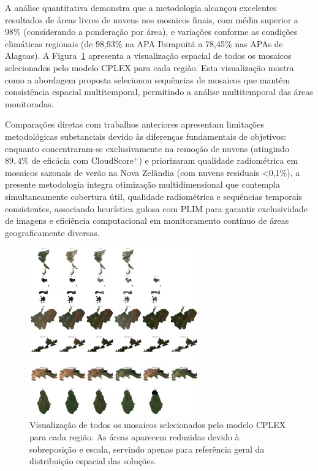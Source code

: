 \documentclass[a4paper,11pt]{article}
\begin{document}
A análise quantitativa demonstra que a metodologia alcançou excelentes resultados de áreas livres de nuvens nos mosaicos finais, com média superior a 98\% (considerando a ponderação por área), e variações conforme as condições climáticas regionais (de 98,93\% na APA Ibirapuitã a 78,45\% nas APAs de Alagoas). A Figura~\ref{fig:all_outputs} apresenta a visualização espacial de todos os mosaicos selecionados pelo modelo CPLEX para cada região. Esta visualização mostra como a abordagem proposta selecionou sequências de mosaicos que mantêm consistência espacial multitemporal, permitindo a análise multitemporal das áreas monitoradas.

Comparações diretas com trabalhos anteriores apresentam limitações metodológicas substanciais devido às diferenças fundamentais de objetivos: enquanto \citet{rodriguez-puerta:2024} concentraram-se exclusivamente na remoção de nuvens (atingindo $89,4\%$ de eficácia com CloudScore$^{+}$) e \citet{shepherd2020automated} priorizaram qualidade radiométrica em mosaicos sazonais de verão na Nova Zelândia (com nuvens residuais <0,1\%), a presente metodologia integra otimização multidimensional que contempla simultaneamente cobertura útil, qualidade radiométrica e sequências temporais consistentes, associando heurística gulosa com PLIM para garantir exclusividade de imagens e eficiência computacional em monitoramento contínuo de áreas geograficamente diversas.

\vspace{-2mm}
\begin{figure}[H]
    \centering
    \includegraphics[width=0.65\textwidth]{img/all_selection.jpg}
    \caption{Visualização de todos os mosaicos selecionados pelo modelo CPLEX para cada região. As áreas aparecem reduzidas devido à sobreposição e escala, servindo apenas para referência geral da distribuição espacial das soluções.}
    \label{fig:all_outputs}
\end{figure}
\vspace{-2mm}
\end{document}

